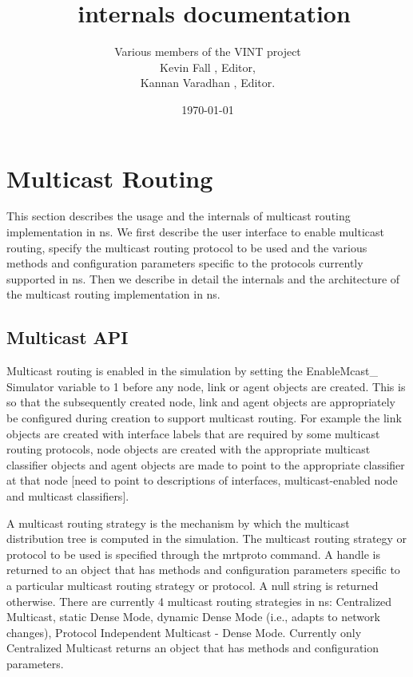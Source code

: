\documentclass{article}
\begin{document}
\title{\nsMulticast\ internals documentation}
\author{%
  Various members of the VINT project \\
  Kevin Fall , Editor,\\
  Kannan Varadhan , Editor.}
\date{\today}

\def\c#1{\ensuremath{C_{#1}}}
\def\d#1{\ensuremath{D_{#1}}}


\section{Multicast Routing}
\label{sec:multicast}
This section describes the usage and the internals of multicast
routing implementation in ns.
We first describe the user interface to enable multicast routing,
specify the multicast routing protocol to be used and the
various methods and configuration parameters specific to the
protocols currently supported in ns.
Then we describe in detail the internals and the architecture of the
multicast routing implementation in ns.

\subsection{Multicast API}
\label{sec:mcast-api}
Multicast routing is enabled in the simulation by setting 
the EnableMcast_ Simulator variable to 1
before any node, link or agent objects are created.
This is so that the subsequently created 
node, link and agent objects are appropriately
be configured during creation to support multicast routing.
For example the link objects are created with interface labels that
are required by some multicast routing protocols, 
node objects are created with the 
appropriate multicast classifier objects
and agent objects are made to point to the 
appropriate classifier at that node
[need to point to descriptions of interfaces, multicast-enabled node
and multicast classifiers].

A multicast routing strategy is the mechanism by which
the multicast distribution tree
is computed in the simulation.
The multicast routing strategy or protocol
to be used is specified through the mrtproto command.
A handle is returned to an object that has 
methods and configuration parameters specific to a
particular multicast routing strategy or protocol.
A null string is returned otherwise.
There are currently 4 multicast routing strategies in ns: Centralized
Multicast, static Dense Mode, dynamic Dense Mode (i.e., adapts to
network changes), Protocol Independent Multicast - Dense Mode.
Currently only Centralized Multicast returns an object that has
methods and configuration parameters.
\end{document}
